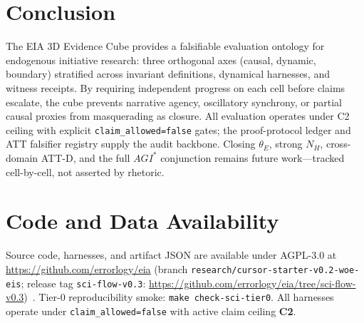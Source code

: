 \documentclass[11pt,a4paper]{article}
\theoremstyle{definition}
\begin{document}


\section{Conclusion}\label{sec:conclusion}

The EIA 3D Evidence Cube provides a falsifiable evaluation ontology for endogenous initiative research: three orthogonal axes (causal, dynamic, boundary) stratified across invariant definitions, dynamical harnesses, and witness receipts. By requiring independent progress on each cell before claims escalate, the cube prevents narrative agency, oscillatory synchrony, or partial causal proxies from masquerading as closure. All evaluation operates under C2 ceiling with explicit \texttt{claim\_allowed=false} gates; the proof-protocol ledger and ATT falsifier registry supply the audit backbone. Closing $\theta_E$, strong $N_H$, cross-domain ATT-D, and the full $AGI^{*}$ conjunction remains future work---tracked cell-by-cell, not asserted by rhetoric.

\section{Code and Data Availability}\label{sec:code-data}

Source code, harnesses, and artifact JSON are available under AGPL-3.0 at \url{https://github.com/errorlogy/eia} (branch \texttt{research/cursor-starter-v0.2-woe-eis}; release tag \texttt{sci-flow-v0.3}: \url{https://github.com/errorlogy/eia/tree/sci-flow-v0.3})~\cite{kuznetsov2026eia,kuznetsov2026sciflowrelease}. Tier-0 reproducibility smoke: \texttt{make check-sci-tier0}. All harnesses operate under \texttt{claim\_allowed=false} with active claim ceiling \textbf{C2}.



\end{document}
